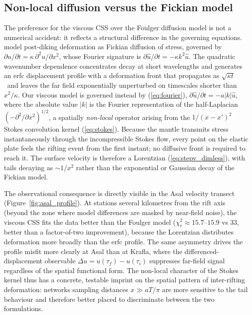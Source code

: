 \documentclass[extra]{gji}
\begin{document}
\subsection{Non-local diffusion versus the Fickian model}
\label{sec:disc_nonlocal}

The preference for the viscous CSS over the Foulger diffusion model
is not a numerical accident: it reflects a structural difference in the
governing equations.  \citet{foulger1992post} model post-diking deformation as
Fickian diffusion of stress, governed by $\partial u/\partial t =
\kappa\,\partial^2 u/\partial x^2$, whose Fourier signature is
$\partial\hat{u}/\partial t = -\kappa k^2\hat{u}$.  The quadratic wavenumber
dependence concentrates decay at short wavelengths and generates an erfc
displacement profile with a deformation front that propagates as
$\sqrt{\kappa t}$~and leaves the far field exponentially unperturbed on
timescales shorter than $x^2/\kappa$.  Our viscous model is governed instead
by (\ref{eq:fourier}), $\partial\hat{u}/\partial t = -a|k|\hat{u}$, where the
absolute value $|k|$ is the Fourier representation of the half-Laplacian
$(-\partial^2/\partial x^2)^{1/2}$, a spatially \emph{non-local} operator
arising from the $1/(x-x')^2$ Stokes convolution kernel (\ref{eq:stokes}).
Because the mantle transmits stress instantaneously through the incompressible
Stokes flow, every point on the elastic plate feels the rifting event from the
first instant; no diffusive front is required to reach it.  The surface
velocity is therefore a Lorentzian (\ref{eq:stepv_dimless}), with tails
decaying as $\sim 1/x^2$ rather than the exponential or Gaussian decay of the
Fickian model.

The observational consequence is directly visible in the Asal velocity
transect (Figure~\ref{fig:asal_profile}).  At stations several kilometres from
the rift axis (beyond the zone where model differences are masked by
near-field noise), the viscous CSS fits the data better than the
Foulger model ($\chi^2_r \approx 15.7$--$15.9$ vs $33$, better than a
factor-of-two improvement), because
the Lorentzian distributes deformation more broadly than the erfc profile.
The same asymmetry drives the profile misfit more clearly at Asal than at
Krafla, where the differenced-displacement observable
$\Delta u = u(\tau_f) - u(\tau_i)$ suppresses far-field signal regardless of
the spatial functional form.  The non-local character of the Stokes kernel
thus has a concrete, testable imprint on the spatial pattern of inter-rifting
deformation: networks sampling distances $x \gg aT/\pi$ are more sensitive to
the tail behaviour and therefore better placed to discriminate between the two
formulations.
\end{document}
